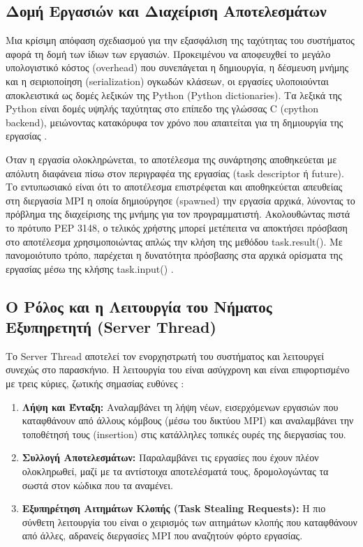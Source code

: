\subsection{Δομή Εργασιών και Διαχείριση Αποτελεσμάτων}

Μια κρίσιμη απόφαση σχεδιασμού για την εξασφάλιση της ταχύτητας του συστήματος αφορά τη 
δομή των ίδιων των εργασιών. Προκειμένου να αποφευχθεί το μεγάλο υπολογιστικό κόστος 
(overhead) που συνεπάγεται η δημιουργία, η δέσμευση μνήμης και η σειριοποίηση 
(serialization) ογκωδών κλάσεων, οι εργασίες υλοποιούνται αποκλειστικά ως δομές λεξικών της Python (Python dictionaries). Τα λεξικά της Python είναι δομές υψηλής ταχύτητας στο επίπεδο της γλώσσας C (cpython backend), μειώνοντας κατακόρυφα τον χρόνο που απαιτείται για τη δημιουργία της εργασίας \cite{hadjidoukas2020torcpy}.

Όταν η εργασία ολοκληρώνεται, το αποτέλεσμα της συνάρτησης αποθηκεύεται με απόλυτη 
διαφάνεια πίσω στον περιγραφέα της εργασίας (task descriptor ή future). Το εντυπωσιακό είναι ότι το αποτέλεσμα επιστρέφεται και αποθηκεύεται απευθείας στη διεργασία MPI η οποία δημιούργησε (spawned) την εργασία αρχικά, λύνοντας το πρόβλημα της διαχείρισης της μνήμης για τον προγραμματιστή. Ακολουθώντας πιστά το πρότυπο PEP 3148, ο τελικός 
χρήστης μπορεί μετέπειτα να αποκτήσει πρόσβαση στο αποτέλεσμα χρησιμοποιώντας απλώς 
την κλήση της μεθόδου task.result(). Με πανομοιότυπο τρόπο, παρέχεται η δυνατότητα 
πρόσβασης στα αρχικά ορίσματα της εργασίας μέσω της κλήσης task.input() \cite{hadjidoukas2020torcpy}.

\subsection{ Ο Ρόλος και η Λειτουργία του Νήματος Εξυπηρετητή (Server Thread)}

Το Server Thread αποτελεί τον ενορχηστρωτή του συστήματος και λειτουργεί συνεχώς στο 
παρασκήνιο. Η λειτουργία του είναι ασύγχρονη και είναι επιφορτισμένο με τρεις κύριες, ζωτικής σημασίας ευθύνες \cite{hadjidoukas2020torcpy}:

\begin{enumerate}
    \item \textbf{Λήψη και Ένταξη:} Αναλαμβάνει τη λήψη νέων, εισερχόμενων εργασιών που καταφθάνουν από άλλους κόμβους (μέσω του δικτύου MPI) και αναλαμβάνει την τοποθέτησή τους (insertion) στις κατάλληλες τοπικές ουρές της διεργασίας του.
    \item \textbf{Συλλογή Αποτελεσμάτων:} Παραλαμβάνει τις εργασίες που έχουν πλέον ολοκληρωθεί, μαζί με τα αντίστοιχα αποτελέσματά τους, δρομολογώντας τα σωστά στον κώδικα που τα αναμένει.
    \item \textbf{Εξυπηρέτηση Αιτημάτων Κλοπής (Task Stealing Requests):} Η πιο σύνθετη λειτουργία του είναι ο χειρισμός των αιτημάτων κλοπής που καταφθάνουν από άλλες, αδρανείς διεργασίες MPI που αναζητούν φόρτο εργασίας.
\end{enumerate}

